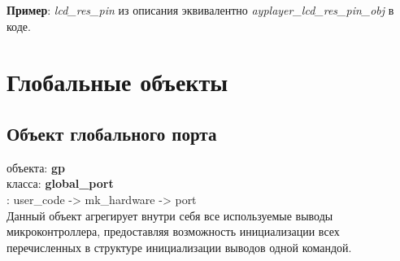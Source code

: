 \documentclass[a4paper, 12pt]{article}
\begin{document}
\textbf{Пример}: \textit{lcd\_res\_pin} из описания эквивалентно \textit{ayplayer\_lcd\_res\_pin\_obj} в коде.


\section{Глобальные объекты}

\subsection{Объект глобального порта}
 объекта: \textbf{gp}\\
 класса: \textbf{global\_port}\\
: user\_code -> mk\_hardware -> port\\

Данный объект агрегирует внутри себя все используемые выводы микроконтроллера, предоставляя возможность инициализации всех перечисленных в структуре инициализации выводов одной командой.
\end{document}
